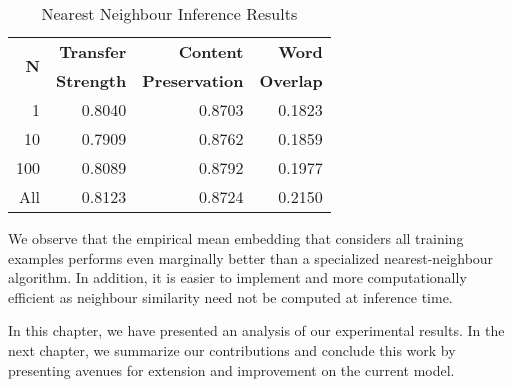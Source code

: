\begin{table}[ht]
	\centering
	\begin{tabular}{| r | r | r | r |}
		\hline
		\multirow{2}{*}{
		\textbf{$\bm N$}} & \textbf{Transfer} & \textbf{Content}      & \textbf{Word}    \\
		            & \textbf{Strength} & \textbf{Preservation} & \textbf{Overlap} \\
		\hline
		\hline
		1           & 0.8040            & 0.8703                & 0.1823           \\
		\hline
		10          & 0.7909            & 0.8762                & 0.1859           \\
		\hline
		100         & 0.8089            & 0.8792                & 0.1977           \\
		\hline
		All         & 0.8123            & 0.8724                & 0.2150           \\
		\hline
	\end{tabular}
	\caption{Nearest Neighbour Inference Results}
	\label{tab:nearest-neighbour-inference-results}
\end{table}

We observe that the empirical mean embedding that considers all training examples performs even marginally better than a specialized nearest-neighbour algorithm. In addition, it is easier to implement and more computationally efficient as neighbour similarity need not be computed at inference time.


In this chapter, we have presented an analysis of our experimental results. In the next chapter, we summarize our contributions and conclude this work by presenting avenues for extension and improvement on the current model.
